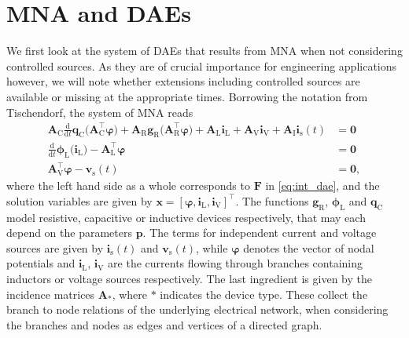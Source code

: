 \documentclass[AMA,STIX1COL]{WileyNJD-v2}
\newcommand{\mb}[1]{\mathbf{#1}}
\newcommand{\mr}[1]{\mathrm{#1}}
\newcommand{\T}{{\!\top}}
\newcommand{\ddt}{\frac{\mathrm{d}}{\mathrm{d}t}}
\newcommand{\A}[1]{\mb{A}_\mr{#1}}
\newcommand{\AT}[1]{\mb{A}_\mr{#1}^{\T}}
\newcommand{\qC}{\mb{q}_\mr{C}}
\newcommand{\gR}{\mb{g}_\mr{R}}
\newcommand{\phiL}{\boldsymbol{\phi}_\mr{L}}
\newcommand{\vphi}{\boldsymbol{\varphi}}
\renewcommand{\i}[1]{\mb{i}_\mr{#1}}
\renewcommand{\v}[1]{\mb{v}_\mr{#1}}
\begin{document}
\section{MNA and DAEs}
\label{sec:md}
We first look at the system of DAEs that results from MNA when not considering controlled sources. As they are of crucial importance for engineering applications however, we will note whether extensions including controlled sources are available or missing at the appropriate times. Borrowing the notation from Tischendorf\cite{tischendorf1999}, the system of MNA reads
\begin{subequations}
    \label{eq:md_mnai}
    \begin{align}
            \A{C} \ddt \qC \big( \AT{C} \vphi \big) + \A{R} \gR \big( \AT{R} \vphi \big) + \A{L} \i{L} + \A{V} \i{V} + \A{I} \i{s}(t) &= \mb{0}\\ 
            \ddt \phiL \big( \i{L} \big) - \AT{L} \vphi &= \mb{0}\\
            \AT{V} \vphi - \v{s}(t)&= \mb{0},
    \end{align}
\end{subequations}
where the left hand side as a whole corresponds to $\mb{F}$ in \eqref{eq:int_dae}, and the solution variables are given by $\mb{x} = [\vphi, \i{L}, \i{V}]^\T$. The functions $\gR$, $\phiL$ and $\qC$ model resistive, capacitive or inductive devices respectively, that may each depend on the parameters $\mb{p}$. The terms for independent current and voltage sources are given by $\i{s}(t)$ and $\v{s}(t)$, while $\vphi$ denotes the vector of nodal potentials and $\i{L} $, $\i{V}$ are the currents flowing through branches containing inductors or voltage sources respectively. The last ingredient is given by the incidence matrices $\A{*}$, where $*$ indicates the device type. These collect the branch to node relations of the underlying electrical network, when considering the branches and nodes as edges and vertices of a directed graph.
\end{document}

